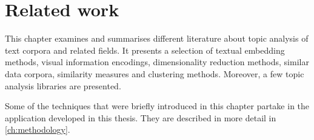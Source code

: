 \chapter{Related work}\label{ch:related-work}
This chapter examines and summarises different literature about topic analysis of text corpora and related fields.
It presents a selection of textual embedding methods, visual information encodings, dimensionality reduction methods, 
similar data corpora, similarity measures and clustering methods.
Moreover, a few topic analysis libraries are presented.
















Some of the techniques that were briefly introduced in this chapter partake in the application developed in this thesis.
They are described in more detail in \autoref{ch:methodology}.





